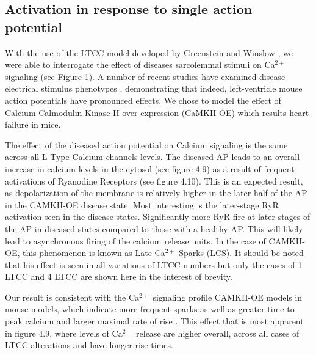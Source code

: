 \documentclass[12pt]{ucsddissertation}
\begin{document}
\subsection{Activation in response to single action potential}
With the use of the LTCC model developed by Greenstein and Winslow \cite{Greenstein2002}, we were able to interrogate the effect of diseases sarcolemmal stimuli on Ca$^{2+}$ signaling (see Figure 1). A number of recent studies have examined disease electrical stimulus phenotypes \cite{Morotti2014, Edwards2014}, demonstrating that indeed, left-ventricle mouse action potentials have pronounced effects. We chose to model the effect of Calcium-Calmodulin Kinase II over-expression (CaMKII-OE) which results heart-failure in mice.

The effect of the diseased action potential on Calcium signaling is the same across all L-Type Calcium channels levels. The diseased AP leads to an overall increase in calcium levels in the cytosol (see figure 4.9) as a result of frequent activations of Ryanodine Receptors (see figure 4.10). This is an expected result, as depolarization of the membrane is relatively higher in the later half of the AP in the CAMKII-OE disease state. Most interesting is the later-stage RyR activation seen in the disease states. Significantly more RyR fire at later stages of the AP in diseased states compared to those with a healthy AP. This will likely lead to asynchronous firing of the calcium release units. In the case of CAMKII-OE, this phenomenon is known as Late Ca$^{2+}$ Sparks (LCS)\cite{Fowler2017}. It should be noted that his effect is seen in all variations of LTCC numbers but only the cases of 1 LTCC and 4 LTCC are shown here in the interest of brevity. 

Our result is consistent with the Ca$^{2+}$ signaling profile  CAMKII-OE models in mouse models, which indicate more frequent sparks as well as greater time to peak calcium and larger maximal rate of rise \cite{Guo2012a}. This effect that is most apparent in figure 4.9, where levels of Ca$^{2+}$  release are higher overall, across all cases of LTCC alterations and have longer rise times. 
\end{document}
